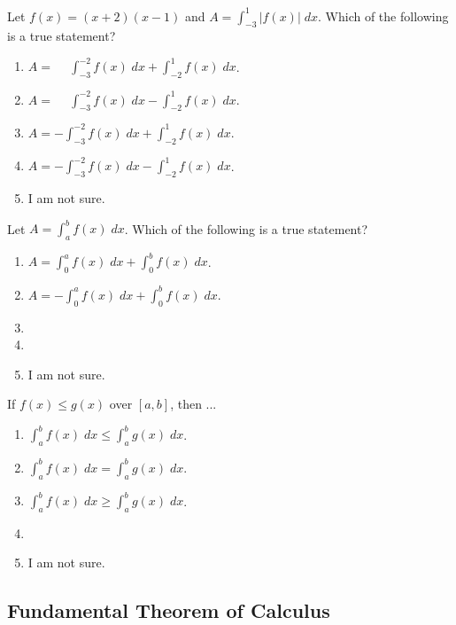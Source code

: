 \documentclass[aspectratio=169, 14pt, t]{beamer}  %
\begin{document}
\begin{poll}
  Let \(f(x) = (x+2)(x-1)\) and \(A = \int_{-3}^{1} \big|f(x)\big| \;dx\).  Which of the following is a true statement?

  \begin{enumerate} \setlength\itemsep{1ex}
    \item \(A = \phantom{-}\int_{-3}^{-2} f(x) \;dx + \int_{-2}^{1} f(x) \;dx\).
    \item \(A = \phantom{-}\int_{-3}^{-2} f(x) \;dx - \int_{-2}^{1} f(x) \;dx\).
    \item \(A = -\int_{-3}^{-2} f(x) \;dx + \int_{-2}^{1} f(x) \;dx\).
    \item \(A = -\int_{-3}^{-2} f(x) \;dx - \int_{-2}^{1} f(x) \;dx\).
    \item I am not sure.
  \end{enumerate}
\end{poll}

\begin{poll}
  Let \(A = \int_{a}^{b} f(x) \;dx\). Which of the following is a true statement?

  \begin{enumerate} \setlength\itemsep{1ex}
    \item \(A = \int_{0}^{a} f(x) \;dx + \int_{0}^{b} f(x) \;dx\).
    \item \(A = -\int_{0}^{a} f(x) \;dx + \int_{0}^{b} f(x) \;dx\).
    \item
    \item
    \item I am not sure.
  \end{enumerate}
\end{poll}

\begin{poll}
  If \(f(x) \le g(x)\) over \([a,b]\), then ...

  \begin{enumerate} \setlength\itemsep{1ex}
    \item \(\int_{a}^{b} f(x) \;dx \le \int_{a}^{b} g(x) \;dx\).
    \item \(\int_{a}^{b} f(x) \;dx = \int_{a}^{b} g(x) \;dx\).
    \item \(\int_{a}^{b} f(x) \;dx \ge \int_{a}^{b} g(x) \;dx\).
    \item
    \item I am not sure.
  \end{enumerate}
\end{poll}

\subsection{Fundamental Theorem of Calculus}
\end{document}
